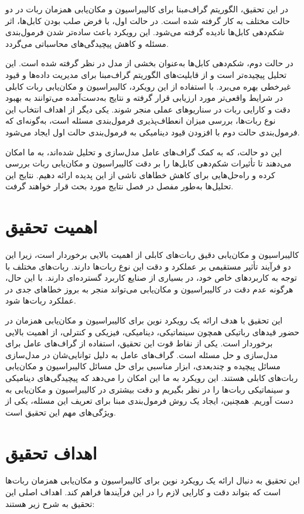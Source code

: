 در این تحقیق، الگوریتم گراف‌مبنا برای کالیبراسیون و مکان‌یابی همزمان ربات در دو حالت مختلف به کار گرفته شده است. در حالت اول، با فرض صلب بودن کابل‌ها، اثر شکم‌دهی کابل‌ها نادیده گرفته می‌شود. این رویکرد باعث ساده‌تر شدن فرمول‌بندی مسئله و کاهش پیچیدگی‌های محاسباتی می‌گردد.

در حالت دوم، شکم‌دهی کابل‌ها به‌عنوان بخشی از مدل در نظر گرفته شده است. این تحلیل پیچیده‌تر است و از قابلیت‌های الگوریتم گراف‌مبنا برای مدیریت داده‌ها و قیود غیرخطی بهره می‌برد. با استفاده از این رویکرد، کالیبراسیون و مکان‌یابی ربات کابلی در شرایط واقعی‌تر مورد ارزیابی قرار گرفته و نتایج به‌دست‌آمده می‌توانند به بهبود دقت و کارایی ربات در سناریوهای عملی منجر شوند. یکی دیگر از اهداف انتخاب این نوع ربات‌ها، بررسی میزان انعطاف‌پذیری فرمول‌بندی مسئله است، به‌گونه‌ای که فرمول‌بندی حالت دوم با افزودن قیود دینامیکی به فرمول‌بندی حالت اول ایجاد می‌شود.

این دو حالت، که به کمک گراف‌های عامل مدل‌سازی و تحلیل شده‌اند، به ما امکان می‌دهند تا تأثیرات شکم‌دهی کابل‌ها را بر دقت کالیبراسیون و مکان‌یابی ربات بررسی کرده و راه‌حل‌هایی برای کاهش خطاهای ناشی از این پدیده ارائه دهیم. نتایج این تحلیل‌ها به‌طور مفصل در فصل نتایج مورد بحث قرار خواهند گرفت.


\section{اهمیت تحقیق}

کالیبراسیون و مکان‌یابی دقیق ربات‌های کابلی از اهمیت بالایی برخوردار است، زیرا این دو فرآیند تأثیر مستقیمی بر عملکرد و دقت این نوع ربات‌ها دارند. ربات‌های مختلف با توجه به کاربردهای خاص خود، در بسیاری از صنایع کاربرد گسترده‌ای دارند. با این حال، هرگونه عدم دقت در کالیبراسیون و مکان‌یابی می‌تواند منجر به بروز خطاهای جدی در عملکرد ربات‌ها شود.

این تحقیق با هدف ارائه یک رویکرد نوین برای کالیبراسیون و مکان‌یابی همزمان در حضور قیدهای رباتیکی همچون سینماتیکی، دینامیکی، فیزیکی و کنترلی، از اهمیت بالایی برخوردار است. یکی از نقاط قوت این تحقیق، استفاده از گراف‌های عامل برای مدل‌سازی و حل مسئله است. گراف‌های عامل به دلیل توانایی‌شان در مدل‌سازی مسائل پیچیده و چندبعدی، ابزار مناسبی برای حل مسائل کالیبراسیون و مکان‌یابی ربات‌های کابلی هستند. این رویکرد به ما این امکان را می‌دهد که پیچیدگی‌های دینامیکی و سینماتیکی ربات‌ها را در نظر بگیریم و دقت بیشتری در کالیبراسیون و مکان‌یابی به دست آوریم. همچنین، ایجاد یک روش فرمول‌بندی مبنا برای تعریف این مسئله، یکی از ویژگی‌های مهم این تحقیق است. 


\section{اهداف تحقیق}
این تحقیق به دنبال ارائه یک رویکرد نوین برای کالیبراسیون و مکان‌یابی همزمان ربات‌ها است که بتواند دقت و کارایی لازم را در این فرآیندها فراهم کند. اهداف اصلی این تحقیق به شرح زیر هستند:

